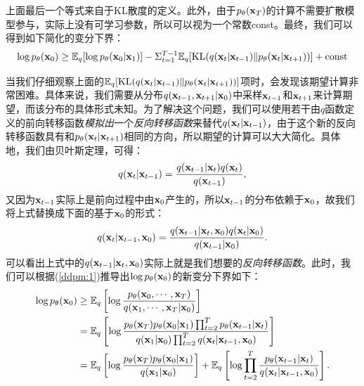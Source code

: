 \documentclass[11pt,a4paper,UTF8]{ctexart}
\begin{document}
上面最后一个等式来自于KL散度的定义。此外，由于$p_{\theta}(\mathbf{x}_T)$的计算不需要扩散模型参与，实际上没有可学习参数，所以可以视为一个常数const。最终，我们可以得到如下简化的变分下界：
\begin{equation}
\log p_{\theta}(\mathbf{x}_0) \geq \mathbb{E}_q[\log p_{\theta}(\mathbf{x}_0|\mathbf{x}_1)]  -\Sigma_{t=1}^{T-1}\mathbb{E}_q[\text{KL}(q(\mathbf{x}_t|\mathbf{x}_{t-1}) \| p_{\theta}(\mathbf{x}_{t}|\mathbf{x}_{t+1}))] + \text{const}
\label{ddpm:3}
\end{equation}

当我们仔细观察上面的$\mathbb{E}_q[\text{KL}(q(\mathbf{x}_t|\mathbf{x}_{t-1}) \| p_{\theta}(\mathbf{x}_{t}|\mathbf{x}_{t+1}))]$项时，会发现该期望计算非常困难。具体来说，我们需要从分布$q(\mathbf{x}_{t-1},\mathbf{x}_{t+1}|\mathbf{x}_0)$中采样$\mathbf{x}_{t-1}$和$\mathbf{x}_{t+1}$来计算期望，而该分布的具体形式未知。为了解决这个问题，我们可以使用若干由$q$函数定义的前向转移函数\emph{模拟出}一个\emph{反向转移函数}来替代$q(\mathbf{x}_t|\mathbf{x}_{t-1})$，由于这个新的反向转移函数具有和$p_{\theta}(\mathbf{x}_t|\mathbf{x}_{t+1})$相同的方向，所以期望的计算可以大大简化。具体地，我们由贝叶斯定理，可得：
\begin{equation*}
    q(\mathbf{x}_t|\mathbf{x}_{t-1})=\frac{q(\mathbf{x}_{t-1}|\mathbf{x}_t)q(\mathbf{x}_t)}{q(\mathbf{x}_{t-1})},
\end{equation*}
又因为$\mathbf{x}_{t-1}$实际上是前向过程中由$\mathbf{x}_0$产生的，所以$\mathbf{x}_{t-1}$的分布依赖于$\mathbf{x}_0$，故我们将上式替换成下面的基于$\mathbf{x}_0$的形式：
\begin{equation}
    q(\mathbf{x}_t|\mathbf{x}_{t-1},\mathbf{x}_0)=\frac{q(\mathbf{x}_{t-1}|\mathbf{x}_t,\mathbf{x}_0)q(\mathbf{x}_t|\mathbf{x}_0)}{q(\mathbf{x}_{t-1}|\mathbf{x}_0)}.
\label{ddpm:bayes}
\end{equation}
可以看出上式中的$q(\mathbf{x}_{t-1}|\mathbf{x}_t,\mathbf{x}_0)$实际上就是我们想要的\emph{反向转移函数}。此时，我们可以根据(\ref{ddpm:1})推导出$\log p_{\theta}(\mathbf{x}_0)$的新变分下界如下：
\begin{align}
\begin{split}
    \log p_{\theta}(\mathbf{x}_0) & \geq \mathbb{E}_q \left[\log \frac{p_{\theta}(\mathbf{x}_0,\cdots,\mathbf{x}_T)}{q(\mathbf{x}_1,\cdots,\mathbf{x}_T|\mathbf{x}_0)}\right] \\
    &= \mathbb{E}_q \left[\log\frac{p_{\theta}(\mathbf{x}_T)p_{\theta}(\mathbf{x}_0|\mathbf{x}_1)\prod_{t=2}^T p_{\theta}(\mathbf{x}_{t-1}|\mathbf{x}_t)}{q(\mathbf{x}_1|\mathbf{x}_0)\prod_{t=2}^T q(\mathbf{x}_t|\mathbf{x}_{t-1},\mathbf{x}_0)} \right] \\
    &= \mathbb{E}_q \left[\log\frac{p_{\theta}(\mathbf{x}_T)p_{\theta}(\mathbf{x}_0|\mathbf{x}_1)}{q(\mathbf{x}_1|\mathbf{x}_0)} \right] + \mathbb{E}_q \left[\log \prod_{t=2}^T \frac{p_{\theta}(\mathbf{x}_{t-1}|\mathbf{x}_t)}{q(\mathbf{x}_t|\mathbf{x}_{t-1},\mathbf{x}_0)} \right].
\end{split}
\label{ddpm:3}
\end{align}
\end{document}
